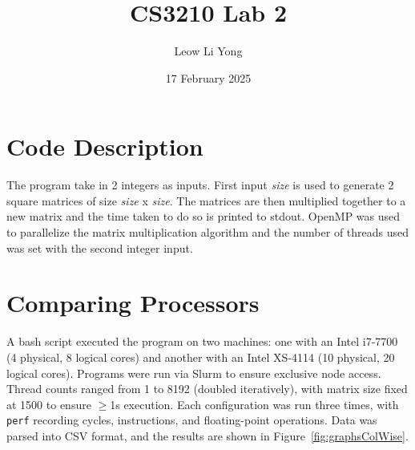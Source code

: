 \documentclass{article}
\title{CS3210 Lab 2}
\author{Leow Li Yong}
\date{17 February 2025}
\begin{document}
\captionsetup{justification=centering}

\section{Code Description}
The program take in 2 integers as inputs. First input \textit{size} is used to generate 2 square matrices of size \textit{size} x \textit{size}. The matrices are then multiplied together to a new matrix and the time taken to do so is printed to stdout. OpenMP was used to parallelize the matrix multiplication algorithm and the number of threads used was set with the second integer input.  

\section{Comparing Processors}
A bash script executed the program on two machines: one with an Intel i7-7700 (4 physical, 8 logical cores) and another with an Intel XS-4114 (10 physical, 20 logical cores). Programs were run via Slurm to ensure exclusive node access. Thread counts ranged from 1 to 8192 (doubled iteratively), with matrix size fixed at 1500 to ensure $\geq$1s execution. Each configuration was run three times, with \texttt{perf} recording cycles, instructions, and floating-point operations. Data was parsed into CSV format, and the results are shown in Figure~\ref{fig:graphsColWise}.
\end{document}

